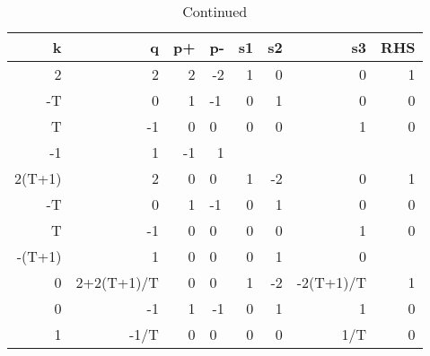     \begin{table}[ht]
        \ContinuedFloat
        \caption{Continued}

        \begin{tabular}{rrrlrrrr}
        k      & q          & p+ & \multicolumn{1}{r}{p-} & s1        & s2         & s3          & RHS       \\ \hline
        2      & 2          & 2  & \multicolumn{1}{r}{-2} & 1         & 0          & 0           & 1         \\
        -T     & 0          & 1  & -1                     & 0         & 1          & 0           & 0         \\
        T      & -1         & 0  & 0                      & 0         & 0          & 1           & 0         \\
        -1     & 1          & -1 & \multicolumn{1}{r}{1}  &           &            &             &           \\ \hline
        2(T+1) & 2          & 0  & 0                      & 1         & -2         & 0           & 1         \\ \hline
        -T     & 0          & 1  & -1                     & 0         & 1          & 0           & 0         \\
        T      & -1         & 0  & 0                      & 0         & 0          & 1           & 0         \\
        -(T+1) & 1          & 0  & 0                      & 0         & 1          & 0           &           \\ \hline
        0      & 2+2(T+1)/T & 0  & 0                      & 1         & -2         & -2(T+1)/T   & 1         \\ \hline
        0      & -1         & 1  & \multicolumn{1}{r}{-1} & 0         & 1          & 1           & 0         \\
        1      & -1/T       & 0  & 0                      & 0         & 0          & 1/T         & 0         \\

\end{tabular}
\end{table}
